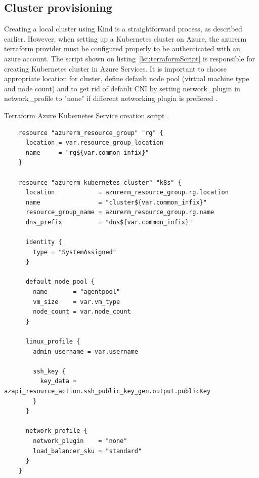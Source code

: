 \subsection{Cluster provisioning}
\label{sec:clusterProvisioning}

Creating a local cluster using Kind is a straightforward process, as described earlier. However, when setting up a Kubernetes cluster on Azure, the azurerm terraform provider must be configured properly to be authenticated with an azure account. The script shown on listing~\ref{lst:terraformScript} is responsible for creating Kubernetes cluster in Azure Services. It is important to choose appropriate location for cluster, define default node pool (virtual machine type and node count) and to get rid of default CNI by setting network\_plugin in network\_profile to "none" if different networking plugin is preffered \cite{AKS}.

\begin{listing}[htb]
  \centering
  \caption{Terraform Azure Kubernetes Service creation script \cite{AKS}.}
  \begin{verbatim}
    resource "azurerm_resource_group" "rg" {
      location = var.resource_group_location
      name     = "rg${var.common_infix}"
    }

    resource "azurerm_kubernetes_cluster" "k8s" {
      location            = azurerm_resource_group.rg.location
      name                = "cluster${var.common_infix}"
      resource_group_name = azurerm_resource_group.rg.name
      dns_prefix          = "dns${var.common_infix}"

      identity {
        type = "SystemAssigned"
      }

      default_node_pool {
        name       = "agentpool"
        vm_size    = var.vm_type
        node_count = var.node_count
      }

      linux_profile {
        admin_username = var.username

        ssh_key {
          key_data = azapi_resource_action.ssh_public_key_gen.output.publicKey
        }
      }

      network_profile {
        network_plugin    = "none"
        load_balancer_sku = "standard"
      }
    }
  \end{verbatim}
  \label{lst:terraformScript}
\end{listing}


